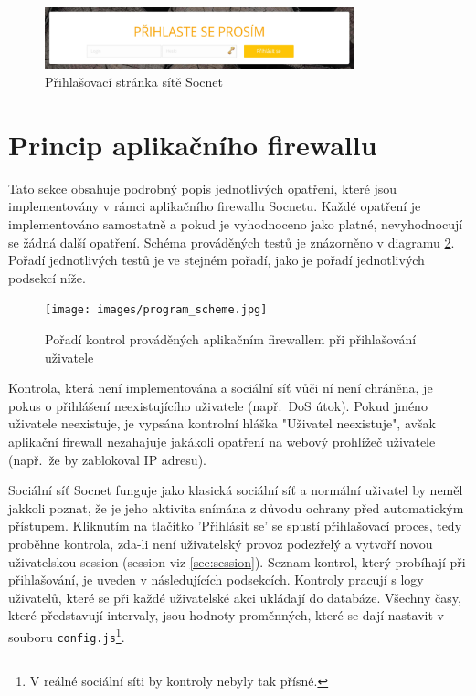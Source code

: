 \begin{figure}[H]
	\centering
	\includegraphics[width=0.8\textwidth]{images/socnet_intro.jpg}
	\caption{Přihlašovací stránka sítě Socnet}
	\label{img:socnet_intro}
\end{figure}

\section{Princip aplikačního firewallu}
Tato sekce obsahuje podrobný popis jednotlivých opatření, které jsou implementovány v rámci aplikačního firewallu Socnetu. Každé opatření je implementováno samostatně a pokud je vyhodnoceno jako platné, nevyhodnocují se žádná další opatření. Schéma prováděných testů je znázorněno v diagramu \ref{img:program_scheme}. Pořadí jednotlivých testů je ve stejném pořadí, jako je pořadí jednotlivých podsekcí níže.

\begin{figure}[ht]
	\centering
	\texttt{[image: images/program\_scheme.jpg]}
	\caption{Pořadí kontrol prováděných aplikačním firewallem při přihlašování uživatele}
	\label{img:program_scheme}
\end{figure}

Kontrola, která není implementována a sociální síť vůči ní není chráněna, je pokus o přihlášení neexistujícího uživatele (např.~DoS útok). Pokud jméno uživatele neexistuje, je vypsána kontrolní hláška "Uživatel neexistuje", avšak aplikační firewall nezahajuje jakákoli opatření na webový prohlížeč uživatele (např.~že by zablokoval IP adresu).

Sociální síť Socnet funguje jako klasická sociální síť a normální uživatel by neměl jakkoli poznat, že je jeho aktivita snímána z důvodu ochrany před automatickým přístupem. Kliknutím na tlačítko 'Přihlásit se' se spustí přihlašovací proces, tedy proběhne kontrola, zda-li není uživatelský provoz podezřelý a vytvoří novou uživatelskou session (session viz \ref{sec:session}). Seznam kontrol, který probíhají při přihlašování, je uveden v následujících podsekcích. Kontroly pracují s logy uživatelů, které se při každé uživatelské akci ukládají do databáze. Všechny časy, které představují intervaly, jsou hodnoty proměnných, které se dají nastavit v souboru \texttt{config.js}\footnote{V reálné sociální síti by kontroly nebyly tak přísné.}.

